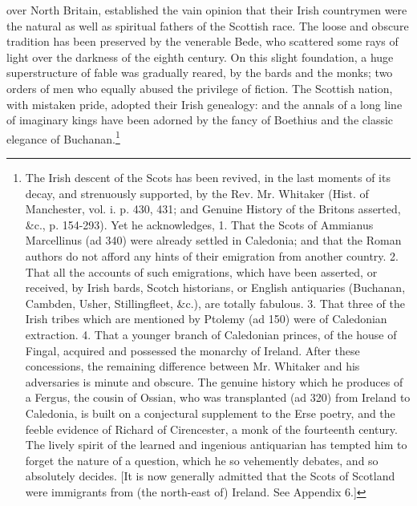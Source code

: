 over North Britain, established the vain opinion that their Irish countrymen were the natural as well as spiritual fathers of the Scottish race. The loose and obscure tradition has been preserved by the venerable Bede, who scattered some rays of light over the darkness of the eighth century. On this slight foundation, a huge superstructure of fable was gradually reared, by the bards and the monks; two orders of men who equally abused the privilege of fiction. The Scottish nation, with mistaken pride, adopted their Irish genealogy: and the annals of a long line of imaginary kings have been adorned by the fancy of Boethius and the classic elegance of Buchanan.\footnote{The Irish descent of the Scots has been revived, in the last moments of its decay, and strenuously supported, by the Rev. Mr. Whitaker (Hist. of Manchester, vol. i. p. 430, 431; and Genuine History of the Britons asserted, \&c., p. 154-293). Yet he acknowledges, 1. That the Scots of Ammianus Marcellinus (ad 340) were already settled in Caledonia; and that the Roman authors do not afford any hints of their emigration from another country. 2. That all the accounts of such emigrations, which have been asserted, or received, by Irish bards, Scotch historians, or English antiquaries (Buchanan, Cambden, Usher, Stillingfleet, \&c.), are totally fabulous. 3. That three of the Irish tribes which are mentioned by Ptolemy (ad 150) were of Caledonian extraction. 4. That a younger branch of Caledonian princes, of the house of Fingal, acquired and possessed the monarchy of Ireland. After these concessions, the remaining difference between Mr. Whitaker and his adversaries is minute and obscure. The genuine history which he produces of a Fergus, the cousin of Ossian, who was transplanted (ad 320) from Ireland to Caledonia, is built on a conjectural supplement to the Erse poetry, and the feeble evidence of Richard of Cirencester, a monk of the fourteenth century. The lively spirit of the learned and ingenious antiquarian has tempted him to forget the nature of a question, which he so vehemently debates, and so absolutely decides. [It is now generally admitted that the Scots of Scotland were immigrants from (the north-east of) Ireland. See Appendix 6.]}

